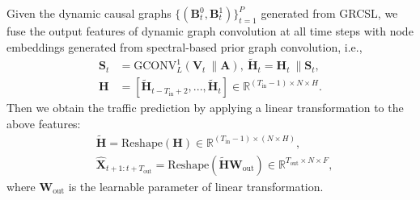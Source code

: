 \documentclass[letterpaper, 10 pt, conference]{ieeeconf}
\begin{document}
Given the dynamic causal graphs $\{(\mathbf{B}^0_t, \mathbf{B}^1_t)\}_{t=1}^{P}$ generated from GRCSL, we fuse the output features of dynamic graph convolution at all time steps with node embeddings generated from spectral-based prior graph convolution, i.e.,
\begin{equation}
        \begin{aligned}
                \mathbf{S}_t&=\text{GCONV}_L^1(\mathbf{V}_t\ \| \mathbf{A}),\ \tilde{\mathbf{H}}_t=\mathbf{H}_t\ \| \mathbf{S}_t,\\
                \mathbf{H}&=[\tilde{\mathbf{H}}_{t-T_\text{in}+2},...,\tilde{\mathbf{H}}_t]\in\mathbb{R}^{(T_\text{in}-1)\times N\times H}.
        \end{aligned}
\end{equation}
Then we obtain the traffic prediction by applying a linear transformation to the above features:
\begin{equation}
        \label{eq:DGCPM}
        \begin{aligned}
                &\tilde{\mathbf{H}}=\text{Reshape}(\mathbf{H})\in\mathbb{R}^{(T_\text{in}-1)\times (N\times H)},\\
                &\hat{\mathbf{X}}_{t+1:t+T_\text{out}}=\text{Reshape}(\tilde{\mathbf{H}}\mathbf{W}_\text{out})\in\mathbb{R}^{T_\text{out}\times N\times F},
        \end{aligned}
\end{equation}
where $\mathbf{W}_\text{out}$ is the learnable parameter of linear transformation.
\end{document}
